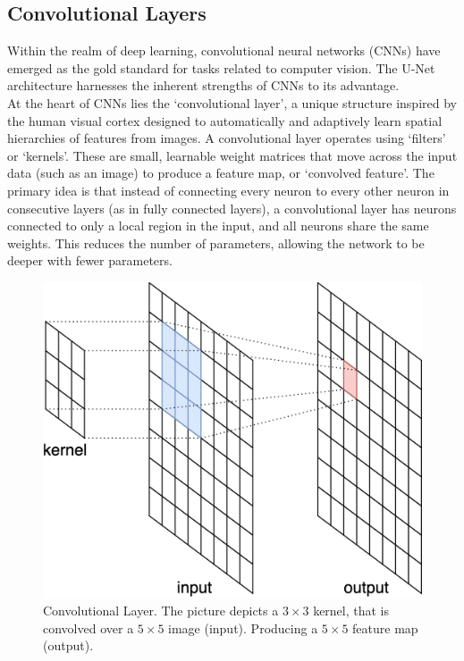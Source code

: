 \subsection{Convolutional Layers}
Within the realm of deep learning, convolutional neural networks (CNNs) have emerged as the gold standard for tasks related to computer vision.
The U-Net architecture harnesses the inherent strengths of CNNs to its advantage.\\[1ex]
\noindent At the heart of CNNs lies the `convolutional layer', a unique structure inspired by the human visual cortex designed to automatically and adaptively learn spatial hierarchies of features from images.
A convolutional layer operates using `filters' or `kernels'. These are small, learnable weight matrices that move across the input data (such as an image) to produce a feature map, or `convolved feature'.
The primary idea is that instead of connecting every neuron to every other neuron in consecutive layers (as in fully connected layers),
a convolutional layer has neurons connected to only a local region in the input, and all neurons share the same weights. This reduces the number of parameters,
allowing the network to be deeper with fewer parameters\cite[5-7]{oshea_introduction_2015}.

\begin{figure}[!hb]
	\centering
	\includegraphics[width=0.4\linewidth]{images/Convolution}
	\caption{Convolutional Layer. The picture depicts a $3\times3$ kernel, that is convolved over a $5\times5$ image (input). Producing a $5\times5$ feature map (output).}
	\label{fig:Conv}
\end{figure}

